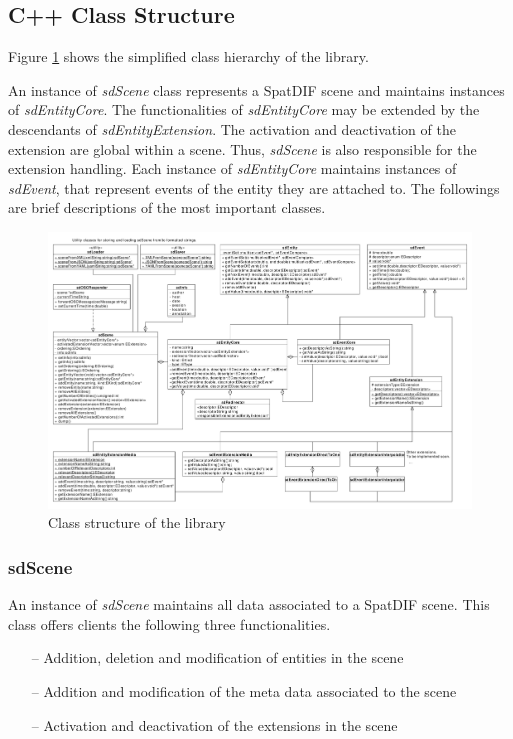 \documentclass[a4paper]{article}
\begin{document}
\subsection{C++ Class Structure}

Figure \ref{fig:class_structure} shows the simplified class hierarchy of the library. 

An instance of {\it sdScene} class represents a SpatDIF scene and maintains instances of {\it sdEntityCore}. The functionalities of {\it sdEntityCore} may be extended by the descendants of {\it sdEntityExtension}. 
The activation and deactivation of the extension are global within a scene. 
Thus, {\it sdScene} is also responsible for the extension handling. 
Each instance of {\it sdEntityCore} maintains instances of {\it sdEvent}, that represent events of the entity they are attached to.
The followings are brief descriptions of the most important classes.

\begin{figure}[t]
\centerline{ 
	\includegraphics[width= 18cm]{classes.pdf}}
\caption{Class structure of the library}
\label{fig:class_structure}
\end{figure}

\subsubsection{sdScene}
An instance of {\it sdScene} maintains all data associated to a SpatDIF scene. This class offers clients the following three functionalities.

\begin{itemize}[leftmargin=*]
\item[--] Addition, deletion and modification of entities in the scene
\item[--] Addition and modification of the meta data associated to the scene
\item[--] Activation and deactivation of the extensions in the scene
\end{itemize}
\end{document}
